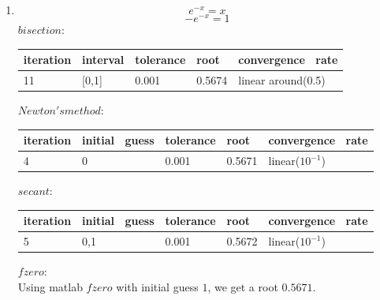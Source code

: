\documentclass[11pt,twoside]{article}
\begin{document}
\begin{enumerate}[leftmargin=0pt]
\begin{enumerate}
	\item 	\[ e^{-x} = x\]
			\[-e^{-x} = 1\]
		$bisection: $
		 \begin{longtable}{|>{\tiny}p{0.5in}|>{\tiny} p{0.5in}| >{\tiny}p{0.5in}|>{\tiny}p{0.5in}|	
		 	>{\tiny} p{0.8in}|}\hline
			iteration&interval&tolerance&root&convergence \ rate \\[0.1in]\hline
			11 &[0,1]&0.001&0.5674&linear around(0.5)\\[0.1in] \hline
		\end{longtable} 
		$Newton's method:$
		 \begin{longtable}{|>{\tiny}p{0.5in}|>{\tiny} p{0.5in}| >{\tiny}p{0.5in}|>{\tiny}p{0.5in}|	
		 	>{\tiny} p{0.8in}|}\hline
			iteration&initial \ guess&tolerance&root&convergence \ rate \\[0.1in]\hline
			4 &0&0.001&0.5671&linear($10^{-1}$)\\[0.1in] \hline
		\end{longtable} 
		$secant:$
		\begin{longtable}{|>{\tiny}p{0.5in}|>{\tiny} p{0.5in}| >{\tiny}p{0.5in}|>{\tiny}p{0.5in}|	
		 	>{\tiny} p{0.8in}|}\hline
			iteration&initial \ guess&tolerance&root&convergence \ rate \\[0.1in]\hline
			5 &0,1&0.001&0.5672& linear($10^{-1}$)\\[0.1in] \hline
		\end{longtable} 
		$fzero:$ \\
		Using matlab  $fzero$ with initial guess $1$, we get a root $0.5671$.


\end{enumerate}
\end{enumerate}
\end{document}
